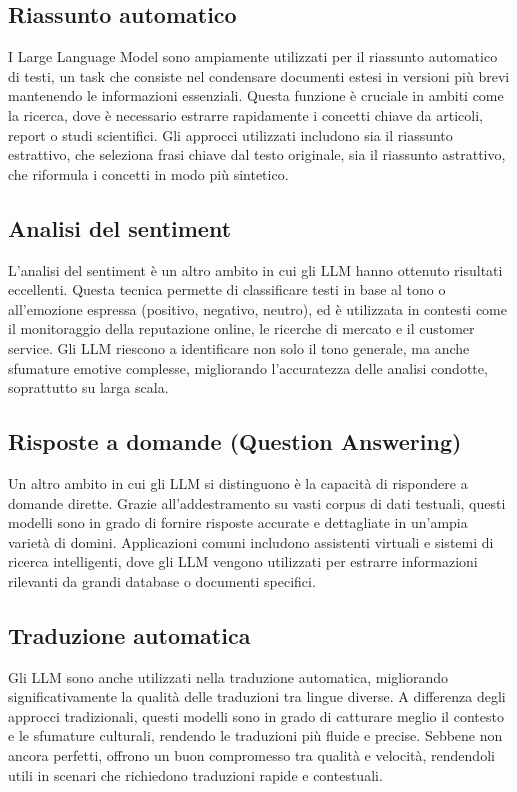 \documentclass[target=mst,aauheader=,style=]{thud}
\begin{document}
\subsection{Riassunto automatico}
I Large Language Model sono ampiamente utilizzati per il riassunto automatico di testi, un task che consiste nel condensare documenti estesi in versioni più brevi mantenendo le informazioni essenziali. Questa funzione è cruciale in ambiti come la ricerca, dove è necessario estrarre rapidamente i concetti chiave da articoli, report o studi scientifici. Gli approcci utilizzati includono sia il riassunto estrattivo, che seleziona frasi chiave dal testo originale, sia il riassunto astrattivo, che riformula i concetti in modo più sintetico.

\subsection{Analisi del sentiment}
L'analisi del sentiment è un altro ambito in cui gli LLM hanno ottenuto risultati eccellenti. Questa tecnica permette di classificare testi in base al tono o all'emozione espressa (positivo, negativo, neutro), ed è utilizzata in contesti come il monitoraggio della reputazione online, le ricerche di mercato e il customer service. Gli LLM riescono a identificare non solo il tono generale, ma anche sfumature emotive complesse, migliorando l'accuratezza delle analisi condotte, soprattutto su larga scala.

\subsection{Risposte a domande (Question Answering)}
Un altro ambito in cui gli LLM si distinguono è la capacità di rispondere a domande dirette. Grazie all’addestramento su vasti corpus di dati testuali, questi modelli sono in grado di fornire risposte accurate e dettagliate in un'ampia varietà di domini. Applicazioni comuni includono assistenti virtuali e sistemi di ricerca intelligenti, dove gli LLM vengono utilizzati per estrarre informazioni rilevanti da grandi database o documenti specifici.

\subsection{Traduzione automatica}
Gli LLM sono anche utilizzati nella traduzione automatica, migliorando significativamente la qualità delle traduzioni tra lingue diverse. A differenza degli approcci tradizionali, questi modelli sono in grado di catturare meglio il contesto e le sfumature culturali, rendendo le traduzioni più fluide e precise. Sebbene non ancora perfetti, offrono un buon compromesso tra qualità e velocità, rendendoli utili in scenari che richiedono traduzioni rapide e contestuali.
\end{document}
